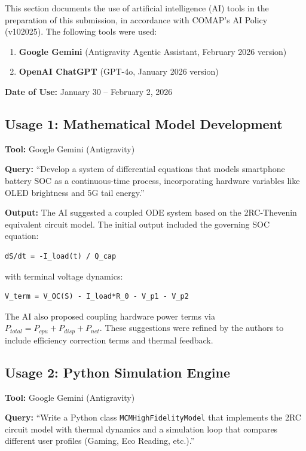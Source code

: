 \documentclass[12pt]{article}
\begin{document}
This section documents the use of artificial intelligence (AI) tools in the preparation of this submission, in accordance with COMAP's AI Policy (v102025). The following tools were used:

\begin{enumerate}
    \item \textbf{Google Gemini} (Antigravity Agentic Assistant, February 2026 version)
    \item \textbf{OpenAI ChatGPT} (GPT-4o, January 2026 version)
\end{enumerate}

\textbf{Date of Use:} January 30 -- February 2, 2026

\subsection*{Usage 1: Mathematical Model Development}
\textbf{Tool:} Google Gemini (Antigravity)

\textbf{Query:} ``Develop a system of differential equations that models smartphone battery SOC as a continuous-time process, incorporating hardware variables like OLED brightness and 5G tail energy.''

\textbf{Output:} The AI suggested a coupled ODE system based on the 2RC-Thevenin equivalent circuit model. The initial output included the governing SOC equation:
\begin{verbatim}
dS/dt = -I_load(t) / Q_cap
\end{verbatim}
with terminal voltage dynamics:
\begin{verbatim}
V_term = V_OC(S) - I_load*R_0 - V_p1 - V_p2
\end{verbatim}
The AI also proposed coupling hardware power terms via $P_{total} = P_{cpu} + P_{disp} + P_{net}$. These suggestions were refined by the authors to include efficiency correction terms and thermal feedback.

\newpage

\subsection*{Usage 2: Python Simulation Engine}
\textbf{Tool:} Google Gemini (Antigravity)

\textbf{Query:} ``Write a Python class \texttt{MCMHighFidelityModel} that implements the 2RC circuit model with thermal dynamics and a simulation loop that compares different user profiles (Gaming, Eco Reading, etc.).''
\end{document}
